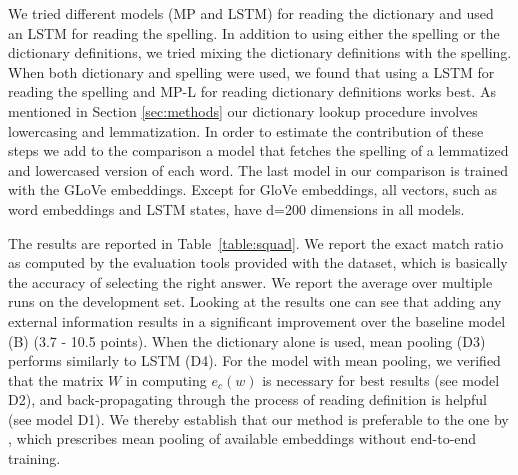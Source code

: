 We tried different models (MP and LSTM) for reading the dictionary and used an LSTM for reading the spelling.  In addition to using either the spelling or the dictionary definitions, we tried mixing the dictionary definitions with the spelling. When both dictionary and spelling were used, we found that using a LSTM for reading the spelling and MP-L for reading dictionary definitions works best. 
As mentioned in Section \ref{sec:methods} our dictionary lookup procedure involves lowercasing and lemmatization. In order to estimate the contribution of these steps we add to the comparison a model that fetches the spelling of a lemmatized and lowercased version of each word. The last model in our comparison is trained with the GLoVe embeddings. Except for GloVe embeddings, all vectors, such as word embeddings and LSTM states, have d=200 dimensions in all models.

The results are reported in Table~\ref{table:squad}. We report the exact match ratio as computed by the evaluation tools provided with the dataset, which is basically the accuracy of selecting the right answer. We report 
the average over multiple runs on the development set.  Looking at the results one can see that adding any external information results in a significant improvement over the baseline model (B) (3.7 - 10.5 points). When the dictionary alone is used, mean pooling (D3) performs similarly to LSTM (D4).
For the model with mean pooling, we verified that the matrix $W$ in computing $e_c(w)$ is necessary for best results (see model D2), and back-propagating through the process of reading definition is helpful (see model D1). We thereby establish that our method is preferable to the one by \citet{long2016leveraging}, which prescribes mean pooling of available embeddings without end-to-end training.


